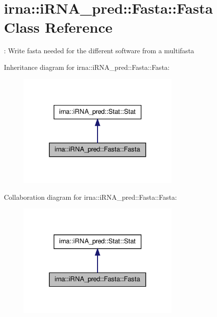 \hypertarget{classirna_1_1iRNA__pred_1_1Fasta_1_1Fasta}{
\section{irna\-:\-:i\-R\-N\-A\-\_\-pred\-:\-:\-Fasta\-:\-:\-Fasta \-Class \-Reference}
\label{classirna_1_1iRNA__pred_1_1Fasta_1_1Fasta}
}


\-: \-Write fasta needed for the different software from a multifasta  




\-Inheritance diagram for irna\-:\-:i\-R\-N\-A\-\_\-pred\-:\-:\-Fasta\-:\-:\-Fasta\-:\nopagebreak
\begin{figure}[H]
\begin{center}
\leavevmode
\includegraphics[width=228pt]{classirna_1_1iRNA__pred_1_1Fasta_1_1Fasta__inherit__graph}
\end{center}
\end{figure}


\-Collaboration diagram for irna\-:\-:i\-R\-N\-A\-\_\-pred\-:\-:\-Fasta\-:\-:\-Fasta\-:\nopagebreak
\begin{figure}[H]
\begin{center}
\leavevmode
\includegraphics[width=228pt]{classirna_1_1iRNA__pred_1_1Fasta_1_1Fasta__coll__graph}
\end{center}
\end{figure}
